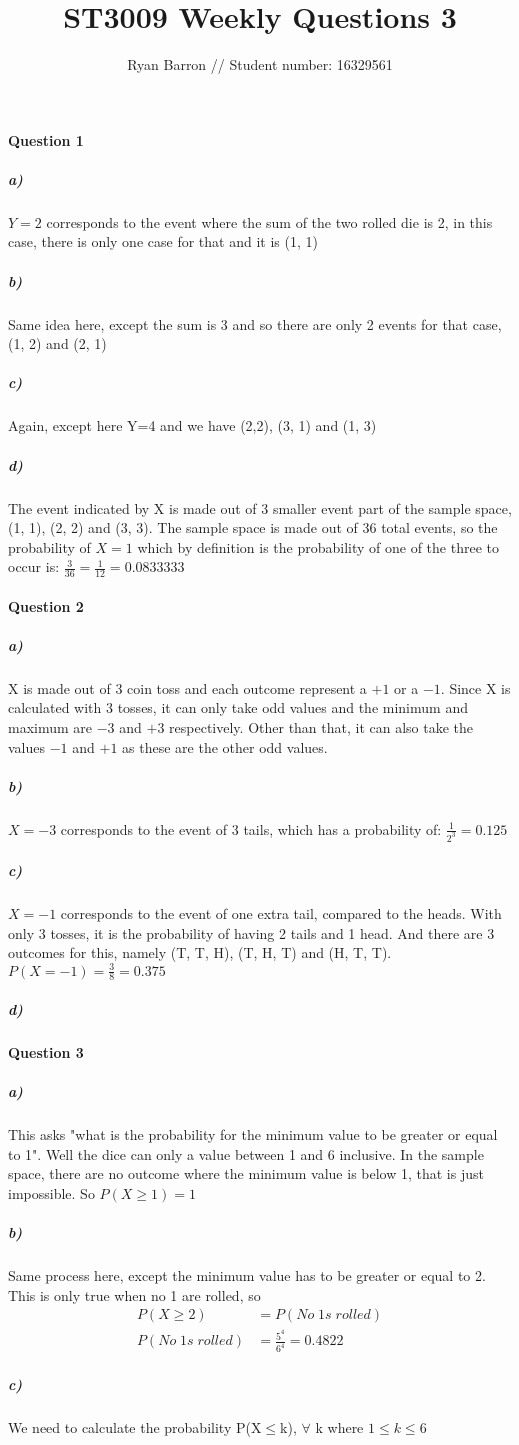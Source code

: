 \documentclass{article}
\title{ST3009 Weekly Questions 3}
\author{Ryan Barron // Student number: 16329561}
\date{}
\begin{document}
\maketitle

\paragraph{Question 1}
\subparagraph{a)}
$Y=2$ corresponds to the event where the sum of the two rolled die is 2, in this case, there is only one case for that and it is (1, 1)
\subparagraph{b)}
Same idea here, except the sum is 3 and so there are only 2 events for that case, (1, 2) and (2, 1)
\subparagraph{c)}
Again, except here Y=4 and we have (2,2), (3, 1) and (1, 3)
\subparagraph{d)}
The event indicated by X is made out of 3 smaller event part of the sample space, (1, 1), (2, 2) and (3, 3). The sample space is made out of 36 total events, so the probability of $X=1$ which by definition is the probability of one of the three to occur is: $\frac{3}{36} = \frac{1}{12} = 0.0833333$

\paragraph{Question 2}
\subparagraph{a)}
X is made out of 3 coin toss and each outcome represent a $+1$ or a $-1$. Since X is calculated with 3 tosses, it can only take odd values and the minimum and maximum are $-3$ and $+3$ respectively. Other than that, it can also take the values $-1$ and $+1$ as these are the other odd values.
\subparagraph{b)}
$X=-3$ corresponds to the event of 3 tails, which has a probability of: $\frac{1}{2^3} = 0.125$
\subparagraph{c)}
$X=-1$ corresponds to the event of one extra tail, compared to the heads. With only 3 tosses, it is the probability of having 2 tails and 1 head. And there are 3 outcomes for this, namely (T, T, H), (T, H, T) and (H, T, T).
$P(X=-1) = \frac{3}{8} = 0.375$
\subparagraph{d)}


\paragraph{Question 3}
\subparagraph{a)}
This asks "what is the probability for the minimum value to be greater or equal to 1". Well the dice can only a value between 1 and 6 inclusive. In the sample space, there are no outcome where the minimum value is below 1, that is just impossible. So $P(X\geq1) = 1$
\subparagraph{b)}
Same process here, except the minimum value has to be greater or equal to 2. This is only true when no 1 are rolled, so 
\begin{equation*}
\begin{split}
P(X\geq2) & = P(No\;1s\;rolled) \\
P(No\;1s\;rolled) & = \frac{5^4}{6^4} = 0.4822
\end{split}
\end{equation*}
\subparagraph{c)}
We need to calculate the probability P(X$\leq$k), $\forall$ k where $1\leq k\leq 6$
\end{document}
